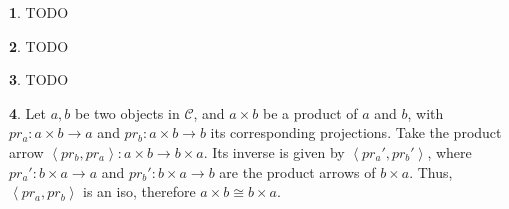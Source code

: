 \documentclass{article}
\theoremstyle{definition}
\newcommand{\CC}{\mathscr{C}}
\newcommand{\ang}[1]{\left\langle #1 \right\rangle}
\theoremstyle{definition}
\newtheorem{solution-internal}{}[subsection]
\newenvironment{solution}{
  \begin{solution-internal}
}{
  \end{solution-internal}
}
\begin{document}
\begin{solution}
TODO
\end{solution}

\begin{solution}
TODO
\end{solution}

\begin{solution}
TODO
\end{solution}

\begin{solution}
  Let $a, b$ be two objects in $\CC$, and $a \times b$ be a product of $a$
  and $b$, with $pr_a\colon a \times b \to a$ and $pr_b\colon a \times b \to b$
  its corresponding projections. Take the product arrow $\ang{pr_b, pr_a}\colon
  a \times b \to b \times a$. Its inverse is given by $\ang{pr_a', pr_b'}$,
  where $pr_a'\colon b \times a \to a$ and $pr_b' \colon b \times a \to b$ are
  the product arrows of $b \times a$. Thus, $\ang{pr_a, pr_b}$ is an
  iso, therefore $a\times b \cong b \times a$.
  \begin{center}
  \end{center}
\end{solution}
\end{document}
